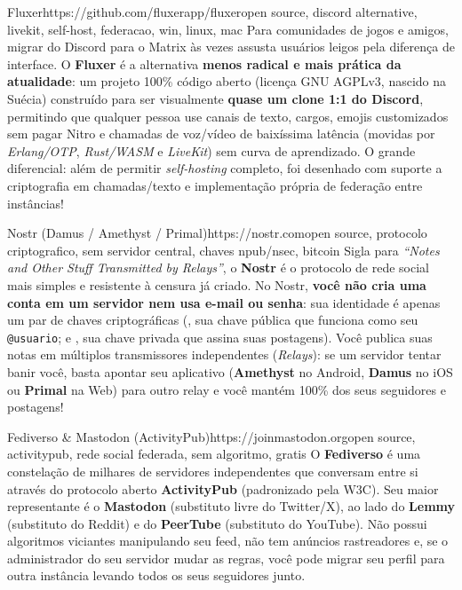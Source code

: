 \documentclass{pousadaguide}
\begin{document}
\begin{ferramenta}[goat,logo=fluxer]{Fluxer}{https://github.com/fluxerapp/fluxer}{open source, discord alternative, livekit, self-host, federacao, win, linux, mac}
Para comunidades de jogos e amigos, migrar do Discord para o Matrix às vezes assusta usuários leigos pela diferença de interface. O \textbf{Fluxer} é a alternativa \textbf{menos radical e mais prática da atualidade}: um projeto 100\% código aberto (licença GNU AGPLv3, nascido na Suécia) construído para ser visualmente \textbf{quase um clone 1:1 do Discord}, permitindo que qualquer pessoa use canais de texto, cargos, emojis customizados sem pagar Nitro e chamadas de voz/vídeo de baixíssima latência (movidas por \emph{Erlang/OTP}, \emph{Rust/WASM} e \emph{LiveKit}) sem curva de aprendizado. O grande diferencial: além de permitir \emph{self-hosting} completo, foi desenhado com suporte a criptografia em chamadas/texto e implementação própria de federação entre instâncias! 
\end{ferramenta}

\begin{ferramenta}[goat,logo=nostr]{Nostr (Damus / Amethyst / Primal)}{https://nostr.com}{open source, protocolo criptografico, sem servidor central, chaves npub/nsec, bitcoin}
Sigla para \emph{``Notes and Other Stuff Transmitted by Relays''}, o \textbf{Nostr} é o protocolo de rede social mais simples e resistente à censura já criado. No Nostr, \textbf{você não cria uma conta em um servidor nem usa e-mail ou senha}: sua identidade é apenas um par de chaves criptográficas (, sua chave pública que funciona como seu \texttt{@usuario}; e , sua chave privada que assina suas postagens). Você publica suas notas em múltiplos transmissores independentes (\emph{Relays}): se um servidor tentar banir você, basta apontar seu aplicativo (\textbf{Amethyst} no Android, \textbf{Damus} no iOS ou \textbf{Primal} na Web) para outro relay e você mantém 100\% dos seus seguidores e postagens! 
\end{ferramenta}

\begin{ferramenta}[recomendado,logo=mastodon]{Fediverso \& Mastodon (ActivityPub)}{https://joinmastodon.org}{open source, activitypub, rede social federada, sem algoritmo, gratis}
O \textbf{Fediverso} é uma constelação de milhares de servidores independentes que conversam entre si através do protocolo aberto \textbf{ActivityPub} (padronizado pela W3C). Seu maior representante é o \textbf{Mastodon} (substituto livre do Twitter/X), ao lado do \textbf{Lemmy} (substituto do Reddit) e do \textbf{PeerTube} (substituto do YouTube). Não possui algoritmos viciantes manipulando seu feed, não tem anúncios rastreadores e, se o administrador do seu servidor mudar as regras, você pode migrar seu perfil para outra instância levando todos os seus seguidores junto. 
\end{ferramenta}
\end{document}
